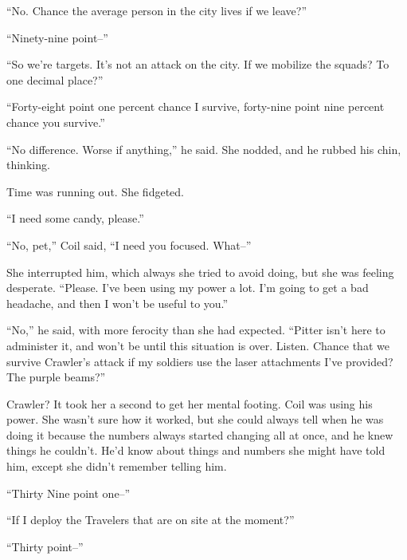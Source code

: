 ``No.  Chance the average person in the city lives if we leave?''



``Ninety-nine point--''



``So we're targets.  It's not an attack on the city.  If we mobilize the squads?  To one decimal place?''



``Forty-eight point one percent chance I survive, forty-nine point nine percent chance you survive.''



``No difference.  Worse if anything,'' he said.  She nodded, and he rubbed his chin, thinking.



Time was running out.  She fidgeted.



``I need some candy, please.''



``No, pet,'' Coil said, ``I need you focused.  What--''



She interrupted him, which always she tried to avoid doing, but she was feeling desperate.  ``Please.  I've been using my power a lot.  I'm going to get a bad headache, and then I won't be useful to you.''



``No,'' he said, with more ferocity than she had expected.  ``Pitter isn't here to administer it, and won't be until this situation is over.  Listen.  Chance that we survive Crawler's attack if my soldiers use the laser attachments I've provided?  The purple beams?''



Crawler?  It took her a second to get her mental footing.  Coil was using his power.  She wasn't sure how it worked, but she could always tell when he was doing it because the numbers always started changing all at once, and he knew things he couldn't.  He'd know about things and numbers she might have told him, except she didn't remember telling him.



``Thirty Nine point one--''



``If I deploy the Travelers that are on site at the moment?''



``Thirty point--''



